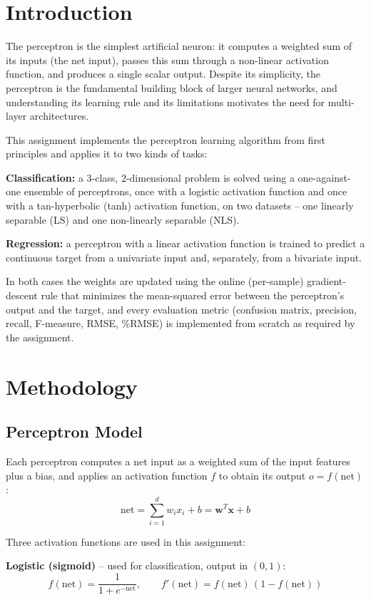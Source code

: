 \documentclass[11pt,a4paper]{article}
\begin{document}
\section{Introduction}
The perceptron is the simplest artificial neuron: it computes a weighted sum of its inputs (the net input), passes this sum through a non-linear activation function, and produces a single scalar output. Despite its simplicity, the perceptron is the fundamental building block of larger neural networks, and understanding its learning rule and its limitations motivates the need for multi-layer architectures.

This assignment implements the perceptron learning algorithm from first principles and applies it to two kinds of tasks:

\textbf{Classification:} a 3-class, 2-dimensional problem is solved using a one-against-one ensemble of perceptrons, once with a logistic activation function and once with a tan-hyperbolic (tanh) activation function, on two datasets -- one linearly separable (LS) and one non-linearly separable (NLS).

\textbf{Regression:} a perceptron with a linear activation function is trained to predict a continuous target from a univariate input and, separately, from a bivariate input.

In both cases the weights are updated using the online (per-sample) gradient-descent rule that minimizes the mean-squared error between the perceptron's output and the target, and every evaluation metric (confusion matrix, precision, recall, F-measure, RMSE, \%RMSE) is implemented from scratch as required by the assignment.
\clearpage

\section{Methodology}
\subsection{Perceptron Model}
Each perceptron computes a net input as a weighted sum of the input features plus a bias, and applies an activation function $f$ to obtain its output $o=f(\text{net})$:
\[
\mathrm{net} = \sum_{i=1}^{d} w_i x_i + b = \mathbf{w}^T\mathbf{x} + b
\]

Three activation functions are used in this assignment:

\textbf{Logistic (sigmoid)} -- used for classification, output in $(0,1)$:
\[
f(\mathrm{net}) = \frac{1}{1+e^{-\mathrm{net}}}, \qquad f'(\mathrm{net}) = f(\mathrm{net})\,(1-f(\mathrm{net}))
\]
\end{document}
